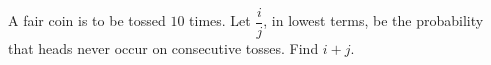 A fair coin is to be tossed $10$ times. Let $\dfrac{i}{j}$, in lowest terms, be the probability that heads never occur on consecutive tosses. Find $i+j$.
